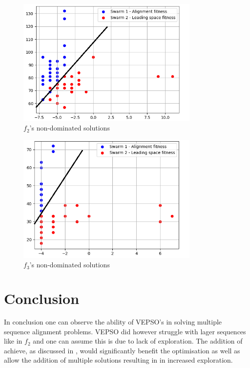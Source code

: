 \documentclass[conference]{IEEEtran}
\begin{document}
\begin{figure}[htbp]
\centerline{\includegraphics[width=90mm]{images/results/f2-solutions.png}}
\caption{$f_2$'s non-dominated solutions }
\label{fig:f2:solutions}
\end{figure}

\begin{figure}[htbp]
\centerline{\includegraphics[width=90mm]{images/results/f3-solutions.png}}
\caption{$f_3$'s non-dominated solutions }
\label{fig:f3:solutions}
\end{figure}

\newpage
\section{Conclusion}
In conclusion one can observe the ability of \ac{VEPSO}'s in solving multiple sequence alignment problems. \ac{VEPSO} did however struggle with lager sequences like in $f_2$ and one can assume this is due to lack of exploration. The addition of achieve, as discussed in \cite{kian-lim:pso}, would significantly benefit the optimisation as well as allow the addition of multiple solutions resulting in in increased exploration.

\newpage

\nocite{*}
\noindent

\indent

\end{document}
